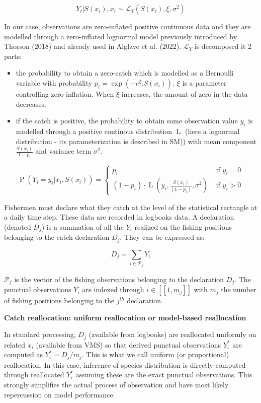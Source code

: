 \documentclass[
  english,
  man,floatsintext]{apa6}
\begin{document}
\[Y_i | S(x_i), x_i \sim \mathcal{L}_Y(S(x_i),\xi,\sigma^2)\]

In our case, observations are zero-inflated positive continuous data and they are modelled through a zero-inflated lognormal model previously introduced by Thorson (2018) and already used in Alglave et al. (2022). \(\mathcal{L}_Y\) is decomposed it 2 parts:

\begin{itemize}
\item
  the probability to obtain a zero-catch which is modelled as a Bernoulli variable with probability \(p_{i}=\exp(-e^\xi .S(x_{i}))\). \(\xi\) is a parameter controlling zero-inflation. When \(\xi\) increases, the amount of zero in the data decreases.
\item
  if the catch is positive, the probability to obtain some observation value \(y_i\) is modelled through a positive continous distribution \(\operatorname{L}\) (here a lognormal distribution - its parameterization is described in SM)) with mean component \(\frac{S(x_{i})}{1-p_{i}}\) and variance term \(\sigma^2\).
\end{itemize}

\[
\operatorname{P}\left(Y_i=y_{i} | x_i, S(x_i)\right) =
\left\{
    \begin{array}{ll}
        p_i & \text { if } y_{i}=0 \\
        \left(1-p_i\right) \cdot \operatorname{L}\left(y_{i },\frac{S(x_i)}{\left(1 - p_i\right)},\sigma^{2} \right) & \text { if } y_{i} > 0
    \end{array}
\right.
\]

Fishermen must declare what they catch at the level of the statistical rectangle at a daily time step. These data are recorded in logbooks data. A declaration (denoted \(D_j\)) is a summation of all the \(Y_i\) realized on the fishing positions belonging to the catch declaration \(D_j\). They can be expressed as:

\[D_j=\sum_{i \in \mathcal{P}_j}{Y_{i}}\]

\(\mathcal{P}_j\) is the vector of the fishing observations belonging to the declaration \(D_j\). The punctual observations \(Y_i\) are indexed through \(i \in [\![1,m_j]\!]\) with \(m_j\) the number of fishing positions belonging to the \(j^{th}\) declaration.

\textbf{Catch reallocation: uniform reallocation or model-based reallocation}

In standard processing, \(D_j\) (available from logbooks) are reallocated uniformly on related \(x_i\) (available from VMS) so that derived punctual observations \(Y^*_i\) are computed as \(Y^*_i=D_j/m_j\). This is what we call uniform (or proportional) reallocation. In this case, inference of species distribution is directly computed through reallocated \(Y^*_i\) assuming these are the exact punctual observations. This strongly simplifies the actual process of observation and have most likely repercussion on model performance.
\end{document}
